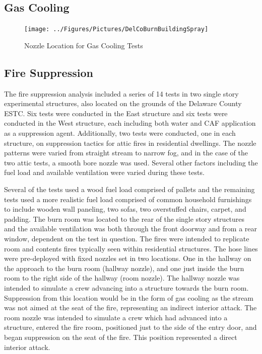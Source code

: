 \documentclass[12pt,oneside]{book}
\begin{document}
\subsection{Gas Cooling}
\label{sec:Gas_Cooling}

\begin{figure}[!ht]
	\texttt{[image: ../Figures/Pictures/DelCoBurnBuildingSpray]}
	\caption{Nozzle Location for Gas Cooling Tests}
	\label{fig:Nozzle_Location_Gas_Cooling_Tests}
\end{figure}

\subsection{Fire Suppression}
\label{sec:Fire_Suppression}

The fire suppression analysis included a series of 14 tests in two single story experimental structures, also located on the grounds of the Delaware County ESTC. Six tests were conducted in the East structure and six tests were conducted in the West structure, each including both water and CAF application as a suppression agent. Additionally, two tests were conducted, one in each structure, on suppression tactics for attic fires in residential dwellings. The nozzle patterns were varied from straight stream to narrow fog, and in the case of the two attic tests, a smooth bore nozzle was used. Several other factors including the fuel load and available ventilation were varied during these tests.

Several of the tests used a wood fuel load comprised of pallets and the remaining tests used a more realistic fuel load comprised of common household furnishings to include wooden wall paneling, two sofas, two overstuffed chairs, carpet, and padding.  The burn room was located to the rear of the single story structures and the available ventilation was both through the front doorway and from a rear window, dependent on the test in question.  The fires were intended to replicate room and contents fires typically seen within residential structures.  The hose lines were pre-deployed with fixed nozzles set in two locations.  One in the hallway on the approach to the burn room (hallway nozzle), and one just inside the burn room to the right side of the hallway (room nozzle). The hallway nozzle was intended to simulate a crew advancing into a structure towards the burn room. Suppression from this location would be in the form of gas cooling as the stream was not aimed at the seat of the fire, representing an indirect interior attack. The room nozzle was intended to simulate a crew which had advanced into a structure, entered the fire room, positioned just to the side of the entry door, and began suppression on the seat of the fire.  This position represented a direct interior attack.
\end{document}
